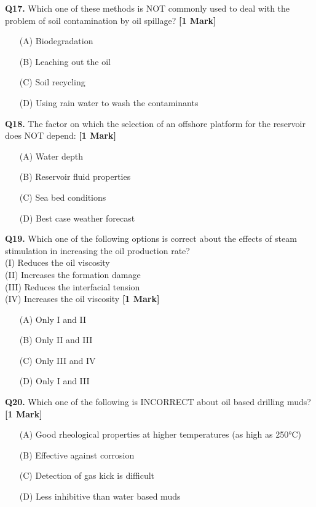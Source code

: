 \documentclass[11pt]{article}
\newcommand{\questiona}[2]{
    \noindent\textbf{Q#2.} #1 \hfill \textbf{[1 Mark]}
}
\begin{document}
\questiona{Which one of these methods is NOT commonly used to deal with the problem of soil contamination by oil spillage?}{17}
\begin{enumerate}
    \item[(A)] Biodegradation  
    \item[(B)] Leaching out the oil  
    \item[(C)] Soil recycling  
    \item[(D)] Using rain water to wash the contaminants  
\end{enumerate}
\vspace{0.5cm}

\questiona{The factor on which the selection of an offshore platform for the reservoir does NOT depend:}{18}
\begin{enumerate}
    \item[(A)] Water depth  
    \item[(B)] Reservoir fluid properties  
    \item[(C)] Sea bed conditions  
    \item[(D)] Best case weather forecast  
\end{enumerate}
\vspace{0.5cm}

\questiona{Which one of the following options is correct about the effects of steam stimulation in increasing the oil production rate? \\
(I) Reduces the oil viscosity \\
(II) Increases the formation damage \\
(III) Reduces the interfacial tension \\
(IV) Increases the oil viscosity}{19}
\begin{enumerate}
    \item[(A)] Only I and II  
    \item[(B)] Only II and III  
    \item[(C)] Only III and IV  
    \item[(D)] Only I and III  
\end{enumerate}
\vspace{0.5cm}

\questiona{Which one of the following is INCORRECT about oil based drilling muds?}{20}
\begin{enumerate}
    \item[(A)] Good rheological properties at higher temperatures (as high as 250°C)  
    \item[(B)] Effective against corrosion  
    \item[(C)] Detection of gas kick is difficult  
    \item[(D)] Less inhibitive than water based muds  
\end{enumerate}
\vspace{0.5cm}
\end{document}
